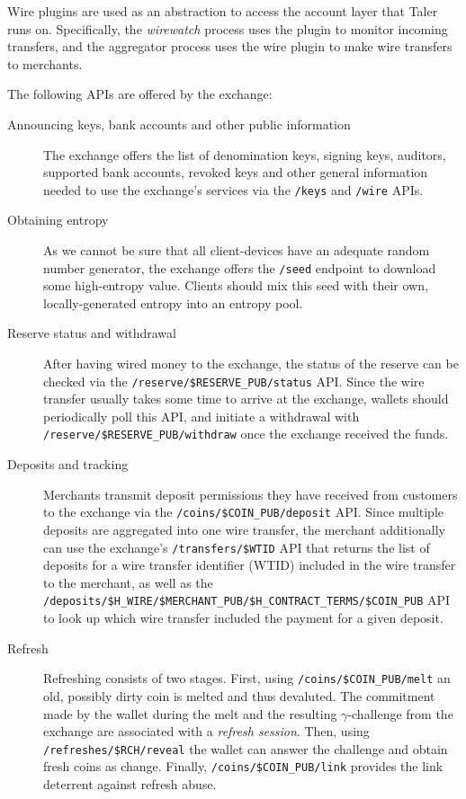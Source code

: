 Wire plugins are used as an abstraction to access the account layer that Taler
runs on.  Specifically, the \textit{wirewatch} process uses the plugin to monitor
incoming transfers, and the aggregator process uses the wire plugin to make
wire transfers to merchants.

The following APIs are offered by the exchange:
\begin{description}
  \item[Announcing keys, bank accounts and other public information]  The
    exchange offers the list of denomination keys, signing keys, auditors,
    supported bank accounts, revoked keys and other general information needed
    to use the exchange's services via the \texttt{/keys} and \texttt{/wire}
    APIs.
  \item[Obtaining entropy] As we cannot be sure that all client-devices have
    an adequate random number generator, the exchange offers the \texttt{/seed}
    endpoint to download some high-entropy value.  Clients should mix this
    seed with their own, locally-generated entropy into an entropy pool.
  \item[Reserve status and withdrawal] After having wired money to the exchange,
    the status of the reserve can be checked via the \texttt{/reserve/\$RESERVE\_PUB/status} API.  Since
    the wire transfer usually takes some time to arrive at the exchange, wallets should periodically
    poll this API, and initiate a withdrawal with \texttt{/reserve/\$RESERVE\_PUB/withdraw} once the exchange received the funds.
  \item[Deposits and tracking]  Merchants transmit deposit permissions they have received from customers
    to the exchange via the \texttt{/coins/\$COIN\_PUB/deposit} API.  Since multiple deposits are aggregated into one wire transfer,
    the merchant additionally can use the exchange's \texttt{/transfers/\$WTID} API that returns the list of deposits for a wire transfer
    identifier (WTID) included in the wire transfer to the merchant, as well as the \texttt{/deposits/\$H\_WIRE/\$MERCHANT\_PUB/\$H\_CONTRACT\_TERMS/\$COIN\_PUB} API to look up
    which wire transfer included the payment for a given deposit.
  \item[Refresh] Refreshing consists of two stages. First, using \texttt{/coins/\$COIN\_PUB/melt} an old, possibly dirty coin is melted and thus devaluted. The commitment made by the wallet during the melt and the resulting $\gamma$-challenge from the exchange are associated with a {\em refresh session}.  Then, using \texttt{/refreshes/\$RCH/reveal} the wallet can answer the challenge and obtain fresh coins as change.  Finally, \texttt{/coins/\$COIN\_PUB/link} provides the link deterrent against refresh abuse.

\end{description}
